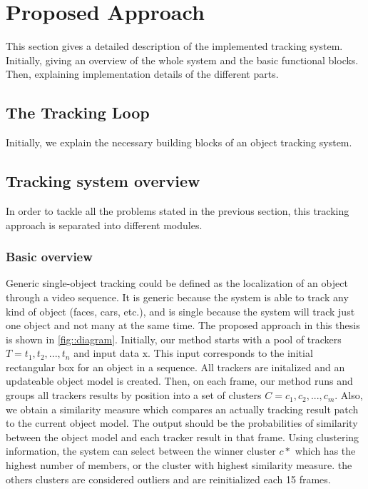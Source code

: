 
\chapter{Proposed Approach} %

\label{chapter4} %


This section gives a detailed description of the implemented tracking system. Initially, giving an overview of the whole system and the basic functional blocks. Then, explaining implementation details of the different parts.

\section{The Tracking Loop}

Initially,  we explain the necessary building blocks of an object tracking system.

\section{Tracking system overview}

In order to tackle all the problems stated in the previous section, this tracking approach is separated into different modules.

\subsection{Basic overview}

Generic single-object tracking could be defined as the localization of an object through a video sequence. It is generic because the system is able to track any kind of object (faces, cars, etc.), and is single because the system will track just one object and not many at the same time. The proposed approach in this thesis is shown in \ref{fig::diagram}. Initially, our method starts with a pool of trackers $T = {t_1, t_2, ..., t_n}$ and input data $\mathrm{x}$. This input corresponds to the initial rectangular box for an object in a sequence. All trackers are initalized and an updateable object model is created. Then, on each frame, our method runs and groups all trackers results by position into a set of clusters $C = {c_1, c_2, ..., c_m}$. Also, we obtain a similarity measure which compares an actually tracking result patch to the current object model. The output should be the probabilities of similarity between the object model and each tracker result in that frame. Using clustering information, the system can select between the winner cluster $c*$ which has the highest number of members, or the cluster with highest similarity measure. the others clusters are considered outliers and are reinitialized each 15 frames.

